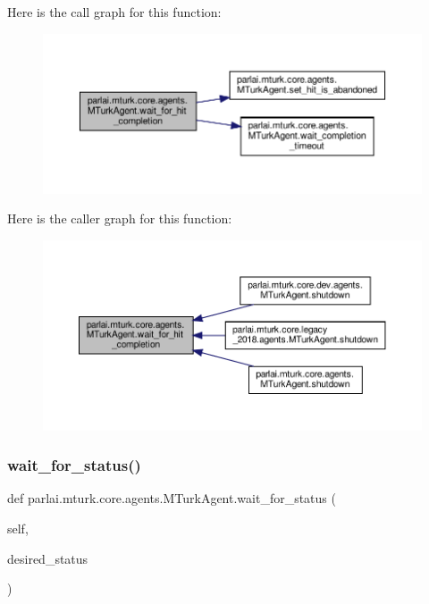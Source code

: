 Here is the call graph for this function\+:
\nopagebreak
\begin{figure}[H]
\begin{center}
\leavevmode
\includegraphics[width=350pt]{classparlai_1_1mturk_1_1core_1_1agents_1_1MTurkAgent_a562fdfdb24a4e2274d45bd4a7aa7cfff_cgraph}
\end{center}
\end{figure}
Here is the caller graph for this function\+:
\nopagebreak
\begin{figure}[H]
\begin{center}
\leavevmode
\includegraphics[width=350pt]{classparlai_1_1mturk_1_1core_1_1agents_1_1MTurkAgent_a562fdfdb24a4e2274d45bd4a7aa7cfff_icgraph}
\end{center}
\end{figure}
\mbox{\label{classparlai_1_1mturk_1_1core_1_1agents_1_1MTurkAgent_af1a00c6edfe78ac978c5bf97e88bdbe4}} 
\subsubsection{\texorpdfstring{wait\+\_\+for\+\_\+status()}{wait\_for\_status()}}
{\footnotesize\ttfamily def parlai.\+mturk.\+core.\+agents.\+M\+Turk\+Agent.\+wait\+\_\+for\+\_\+status (\begin{DoxyParamCaption}\item[{}]{self,  }\item[{}]{desired\+\_\+status }\end{DoxyParamCaption})}

